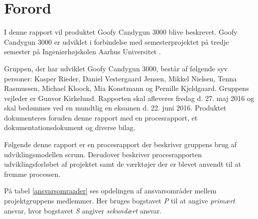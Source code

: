 \chapter{Forord}
I denne rapport vil produktet Goofy Candygun 3000 blive beskrevet. Goofy Candygun 3000 er udviklet i forbindelse med semesterprojektet på tredje semester på Ingeniørhøjskolen Aarhus Universitet . \newline

\noindent Gruppen, der har udviklet Goofy Candygun 3000, består af følgende syv personer: Kasper Rieder, Daniel Vestergaard Jensen, Mikkel Nielsen, Tenna Rasmussen, Michael Kloock, Mia Konstmann og Pernille Kjeldgaard. Gruppens vejleder er Gunvor Kirkelund. Rapporten skal afleveres fredag d. 27. maj 2016 og skal bedømmes ved en mundtlig en eksamen d. 22. juni 2016. Produktet dokumenteres foruden denne rapport med en procesrapport, et dokumentationsdokument og diverse bilag. \newline

\noindent Følgende denne rapport er en procesrapport der beskriver gruppens brug af udviklingsmodellen scrum\cite{scrum}. Derudover beskriver procesrapporten udviklingsforløbet af projektet samt de værktøjer der er blevet anvendt til at fremme processen. \newline

\noindent På tabel \ref{ansvarsomraader} ses opdelingen af ansvarsområder mellem projektgruppens medlemmer. Her bruges bogstavet \textit{P} til at angive \textit{primært} ansvar, hvor bogstavet \textit{S} angiver \textit{sekundært} ansvar.

